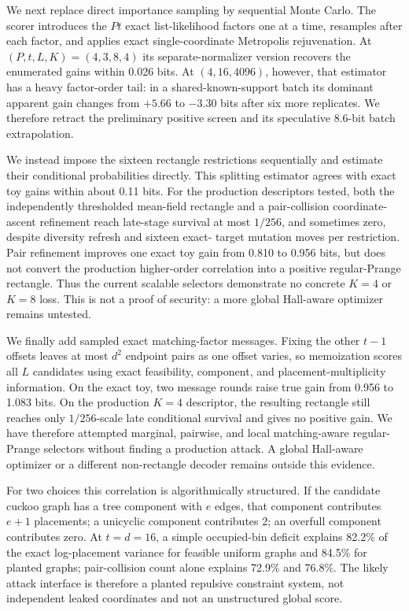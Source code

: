 We next replace direct importance sampling by sequential Monte Carlo.  The
scorer introduces the $Pt$ exact list-likelihood factors one at a time,
resamples after each factor, and applies exact single-coordinate Metropolis
rejuvenation.  At $(P,t,L,K)=(4,3,8,4)$ its separate-normalizer version recovers
the enumerated gains within 0.026 bits.  At $(4,16,4096)$, however, that
estimator has a heavy factor-order tail: in a shared-known-support batch its
dominant apparent gain changes from $+5.66$ to $-3.30$ bits after six more
replicates.  We therefore retract the preliminary positive screen and its
speculative 8.6-bit batch extrapolation.

We instead impose the sixteen rectangle restrictions sequentially and estimate
their conditional probabilities directly.  This splitting estimator agrees
with exact toy gains within about 0.11 bits.  For the production descriptors
tested, both the independently thresholded mean-field rectangle and a
pair-collision coordinate-ascent refinement reach late-stage survival at most
$1/256$, and sometimes zero, despite diversity refresh and sixteen exact-
target mutation moves per restriction.  Pair refinement improves one exact toy
gain from 0.810 to 0.956 bits, but does not convert the production higher-order
correlation into a positive regular-Prange rectangle.  Thus the current
scalable selectors demonstrate no concrete $K=4$ or $K=8$ loss.  This is not a
proof of security: a more global Hall-aware optimizer remains untested.

We finally add sampled exact matching-factor messages.  Fixing the other
$t-1$ offsets leaves at most $d^2$ endpoint pairs as one offset varies, so
memoization scores all $L$ candidates using exact feasibility, component, and
placement-multiplicity information.  On the exact toy, two message rounds
raise true gain from 0.956 to 1.083 bits.  On the production $K=4$ descriptor,
the resulting rectangle still reaches only $1/256$-scale late conditional
survival and gives no positive gain.  We have therefore attempted marginal,
pairwise, and local matching-aware regular-Prange selectors without finding a
production attack.  A global Hall-aware optimizer or a different non-rectangle
decoder remains outside this evidence.

For two choices this correlation is algorithmically structured.  If the
candidate cuckoo graph has a tree component with $e$ edges, that component
contributes $e+1$ placements; a unicyclic component contributes 2; an overfull
component contributes zero.  At $t=d=16$, a simple occupied-bin deficit
explains 82.2\% of the exact log-placement variance for feasible uniform graphs
and 84.5\% for planted graphs; pair-collision count alone explains 72.9\% and
76.8\%.  The likely attack interface is therefore a planted repulsive
constraint system, not independent leaked coordinates and not an unstructured
global score.

